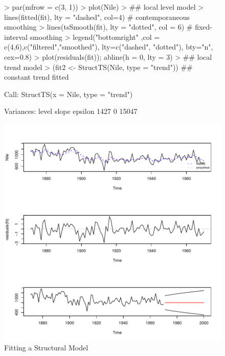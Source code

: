 \documentclass[11pt, a4paper]{article} %
\begin{document}
\begin{figure}
\centering
\begin{Schunk}
\begin{Sinput}
> par(mfrow = c(3, 1))
> plot(Nile)
> ## local level model
> lines(fitted(fit), lty = "dashed", col=4)       # contemporaneous smoothing
> lines(tsSmooth(fit), lty = "dotted", col = 6)   # fixed-interval smoothing
> legend("bottomright" ,col = c(4,6),c("filtered","smoothed"), lty=c("dashed", "dotted"), bty="n", cex=0.8)
> plot(residuals(fit)); abline(h = 0, lty = 3)
> ## local trend model
> (fit2 <- StructTS(Nile, type = "trend")) ## constant trend fitted
\end{Sinput}
\begin{Soutput}
Call:
StructTS(x = Nile, type = "trend")

Variances:
  level    slope  epsilon  
   1427        0    15047  
\end{Soutput}
\end{Schunk}
\includegraphics{alles-055}
\caption{Fitting a Structural Model}
\end{figure}
\end{document}
